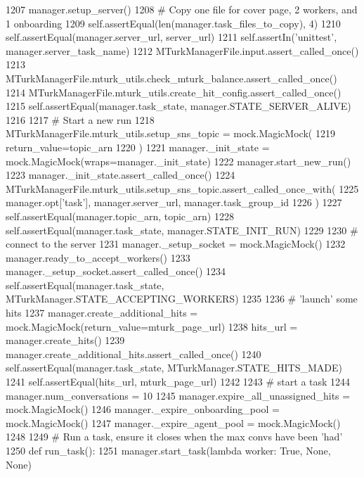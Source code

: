 \begin{DoxyCode}
1207         manager.setup\_server()
1208         \textcolor{comment}{# Copy one file for cover page, 2 workers, and 1 onboarding}
1209         self.assertEqual(len(manager.task\_files\_to\_copy), 4)
1210         self.assertEqual(manager.server\_url, server\_url)
1211         self.assertIn(\textcolor{stringliteral}{'unittest'}, manager.server\_task\_name)
1212         MTurkManagerFile.input.assert\_called\_once()
1213         MTurkManagerFile.mturk\_utils.check\_mturk\_balance.assert\_called\_once()
1214         MTurkManagerFile.mturk\_utils.create\_hit\_config.assert\_called\_once()
1215         self.assertEqual(manager.task\_state, manager.STATE\_SERVER\_ALIVE)
1216 
1217         \textcolor{comment}{# Start a new run}
1218         MTurkManagerFile.mturk\_utils.setup\_sns\_topic = mock.MagicMock(
1219             return\_value=topic\_arn
1220         )
1221         manager.\_init\_state = mock.MagicMock(wraps=manager.\_init\_state)
1222         manager.start\_new\_run()
1223         manager.\_init\_state.assert\_called\_once()
1224         MTurkManagerFile.mturk\_utils.setup\_sns\_topic.assert\_called\_once\_with(
1225             manager.opt[\textcolor{stringliteral}{'task'}], manager.server\_url, manager.task\_group\_id
1226         )
1227         self.assertEqual(manager.topic\_arn, topic\_arn)
1228         self.assertEqual(manager.task\_state, manager.STATE\_INIT\_RUN)
1229 
1230         \textcolor{comment}{# connect to the server}
1231         manager.\_setup\_socket = mock.MagicMock()
1232         manager.ready\_to\_accept\_workers()
1233         manager.\_setup\_socket.assert\_called\_once()
1234         self.assertEqual(manager.task\_state, MTurkManager.STATE\_ACCEPTING\_WORKERS)
1235 
1236         \textcolor{comment}{# 'launch' some hits}
1237         manager.create\_additional\_hits = mock.MagicMock(return\_value=mturk\_page\_url)
1238         hits\_url = manager.create\_hits()
1239         manager.create\_additional\_hits.assert\_called\_once()
1240         self.assertEqual(manager.task\_state, MTurkManager.STATE\_HITS\_MADE)
1241         self.assertEqual(hits\_url, mturk\_page\_url)
1242 
1243         \textcolor{comment}{# start a task}
1244         manager.num\_conversations = 10
1245         manager.expire\_all\_unassigned\_hits = mock.MagicMock()
1246         manager.\_expire\_onboarding\_pool = mock.MagicMock()
1247         manager.\_expire\_agent\_pool = mock.MagicMock()
1248 
1249         \textcolor{comment}{# Run a task, ensure it closes when the max convs have been 'had'}
1250         \textcolor{keyword}{def }run\_task():
1251             manager.start\_task(\textcolor{keyword}{lambda} worker: \textcolor{keyword}{True}, \textcolor{keywordtype}{None}, \textcolor{keywordtype}{None})

\end{DoxyCode}
